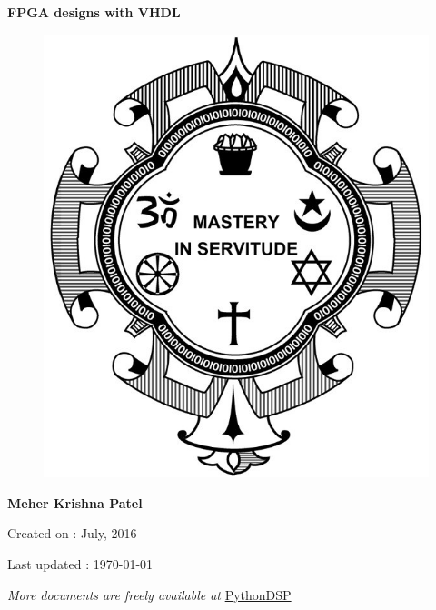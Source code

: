 \begin{titlepage}	
	\centering
	
	\vspace*{40mm} %
	\textbf{\Huge {FPGA designs with VHDL}}
	
	\vspace{0mm}
	\begin{figure}[!h]
		\centering
		\includegraphics[scale=0.3]{title-page/logo.jpg}
	\end{figure}
	
	\vspace{0mm} 
	\Large \textbf{{Meher Krishna Patel}}
	
	\small Created on : July, 2016
	
	\vspace*{0mm}
	\small 	Last updated : \MonthYearFormat\today
	
	\vfill
	\small \textit{More documents are freely available at }{\href{http://pythondsp.readthedocs.io/en/latest/pythondsp/toc.html}{PythonDSP}}	
\end{titlepage}

